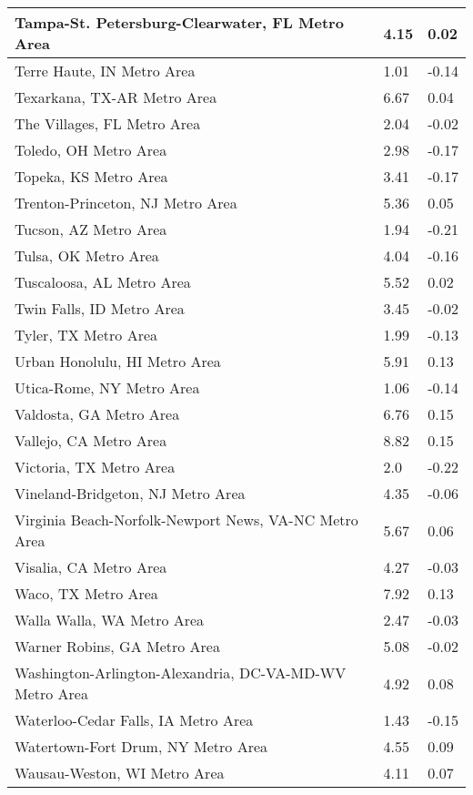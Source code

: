 \documentclass[12pt,oneside, letterpaper]{book}
\begin{document}
\begin{longtable}{| p{} | p{} | p{} |}
    Tampa-St. Petersburg-Clearwater, FL Metro Area & 4.15 & 0.02 \\ \hline
    Terre Haute, IN Metro Area & 1.01 & -0.14 \\ \hline
    Texarkana, TX-AR Metro Area & 6.67 & 0.04 \\ \hline
    The Villages, FL Metro Area & 2.04 & -0.02 \\ \hline
    Toledo, OH Metro Area & 2.98 & -0.17 \\ \hline
    Topeka, KS Metro Area & 3.41 & -0.17 \\ \hline
    Trenton-Princeton, NJ Metro Area & 5.36 & 0.05 \\ \hline
    Tucson, AZ Metro Area & 1.94 & -0.21 \\ \hline
    Tulsa, OK Metro Area & 4.04 & -0.16 \\ \hline
    Tuscaloosa, AL Metro Area & 5.52 & 0.02 \\ \hline
    Twin Falls, ID Metro Area & 3.45 & -0.02 \\ \hline
    Tyler, TX Metro Area & 1.99 & -0.13 \\ \hline
    Urban Honolulu, HI Metro Area & 5.91 & 0.13 \\ \hline
    Utica-Rome, NY Metro Area & 1.06 & -0.14 \\ \hline
    Valdosta, GA Metro Area & 6.76 & 0.15 \\ \hline
    Vallejo, CA Metro Area & 8.82 & 0.15 \\ \hline
    Victoria, TX Metro Area & 2.0 & -0.22 \\ \hline
    Vineland-Bridgeton, NJ Metro Area & 4.35 & -0.06 \\ \hline
    Virginia Beach-Norfolk-Newport News, VA-NC Metro Area & 5.67 & 0.06 \\ \hline
    Visalia, CA Metro Area & 4.27 & -0.03 \\ \hline
    Waco, TX Metro Area & 7.92 & 0.13 \\ \hline
    Walla Walla, WA Metro Area & 2.47 & -0.03 \\ \hline
    Warner Robins, GA Metro Area & 5.08 & -0.02 \\ \hline
    Washington-Arlington-Alexandria, DC-VA-MD-WV Metro Area & 4.92 & 0.08 \\ \hline
    Waterloo-Cedar Falls, IA Metro Area & 1.43 & -0.15 \\ \hline
    Watertown-Fort Drum, NY Metro Area & 4.55 & 0.09 \\ \hline
    Wausau-Weston, WI Metro Area & 4.11 & 0.07 \\ \hline

\end{longtable}
\end{document}
